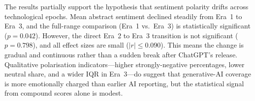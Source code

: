 The results partially support the hypothesis that sentiment polarity drifts
across technological epochs. Mean abstract sentiment declined steadily from
Era~1 to Era~3, and the full-range comparison (Era~1 vs.\ Era~3) is
statistically significant ($p = 0.042$). However, the direct Era~2 to Era~3
transition is not significant ($p = 0.798$), and all effect sizes are small
($|r| \leq 0.090$). This means the change is gradual and continuous rather
than a sudden break after ChatGPT's release. Qualitative polarisation
indicators---higher strongly-negative percentages, lower neutral share, and
a wider IQR in Era~3---do suggest that generative-AI coverage is more
emotionally charged than earlier AI reporting, but the statistical signal
from compound scores alone is modest.
